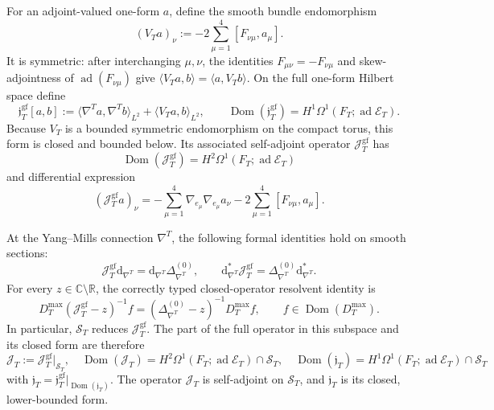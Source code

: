 For an adjoint-valued one-form \(a\), define the smooth bundle
endomorphism
\[
 (V_Ta)_\nu:=-2\sum_{\mu=1}^4[F_{\nu\mu},a_\mu].
\]
It is symmetric: after interchanging \(\mu,\nu\), the identities
\(F_{\mu\nu}=-F_{\nu\mu}\) and skew-adjointness of
\(\operatorname{ad}(F_{\nu\mu})\) give
\(\langle V_Ta,b\rangle=\langle a,V_Tb\rangle\).
On the full one-form Hilbert space define
\begin{equation}
 \mathfrak j_T^{\mathrm{gf}}[a,b]
 :=\langle\nabla^Ta,\nabla^Tb\rangle_{L^2}
   +\langle V_Ta,b\rangle_{L^2},
 \qquad
 \operatorname{Dom}(\mathfrak j_T^{\mathrm{gf}})
 =H^1\Omega^1(F_T;\operatorname{ad}\mathscr E_T).
 \label{cusp-magnetic-full-jacobi-form}
\end{equation}
Because \(V_T\) is a bounded symmetric endomorphism on the compact
torus, this form is closed and bounded below.  Its associated
self-adjoint operator \(\mathcal J_T^{\mathrm{gf}}\) has
\begin{equation}
 \operatorname{Dom}(\mathcal J_T^{\mathrm{gf}})
 =H^2\Omega^1(F_T;\operatorname{ad}\mathscr E_T)
 \label{cusp-magnetic-full-jacobi-domain}
\end{equation}
and differential expression
\[
 (\mathcal J_T^{\mathrm{gf}}a)_\nu
 =-\sum_{\mu=1}^4\nabla_{e_\mu}\nabla_{e_\mu}a_\nu
  -2\sum_{\mu=1}^4[F_{\nu\mu},a_\mu].
\]

\begin{proposition}
\label{cusp-magnetic-jacobi-reduction-proposition}
At the Yang--Mills connection \(\nabla^T\), the following formal
identities hold on smooth sections:
\begin{equation}
 \mathcal J_T^{\mathrm{gf}}\mathrm d_{\nabla^T}
 =\mathrm d_{\nabla^T}\Delta_{\nabla^T}^{(0)},
 \qquad
 \mathrm d_{\nabla^T}^*\mathcal J_T^{\mathrm{gf}}
 =\Delta_{\nabla^T}^{(0)}\mathrm d_{\nabla^T}^*.
 \label{cusp-magnetic-jacobi-intertwining}
\end{equation}
For every \(z\in\mathbb C\setminus\mathbb R\), the correctly typed
closed-operator resolvent identity is
\begin{equation}
 D_T^{\max}(\mathcal J_T^{\mathrm{gf}}-z)^{-1}f
 =(\Delta_{\nabla^T}^{(0)}-z)^{-1}D_T^{\max}f,
 \qquad f\in\operatorname{Dom}(D_T^{\max}).
 \label{cusp-magnetic-jacobi-resolvent-intertwining}
\end{equation}
In particular, \(\mathscr S_T\) reduces
\(\mathcal J_T^{\mathrm{gf}}\).  The part of the full operator in this
subspace and its closed form are therefore
\begin{equation}
 \mathcal J_T
 :=\mathcal J_T^{\mathrm{gf}}\big|_{\mathscr S_T},
 \quad
 \operatorname{Dom}(\mathcal J_T)
 =H^2\Omega^1(F_T;\operatorname{ad}\mathscr E_T)\cap\mathscr S_T,
 \quad
 \operatorname{Dom}(\mathfrak j_T)
 =H^1\Omega^1(F_T;\operatorname{ad}\mathscr E_T)\cap\mathscr S_T
 \label{cusp-magnetic-reduced-jacobi-domain}
\end{equation}
with
\(\mathfrak j_T=\mathfrak j_T^{\mathrm{gf}}|_{\operatorname{Dom}(\mathfrak j_T)}\).
The operator \(\mathcal J_T\) is self-adjoint on \(\mathscr S_T\), and
\(\mathfrak j_T\) is its closed, lower-bounded form.
\end{proposition}

